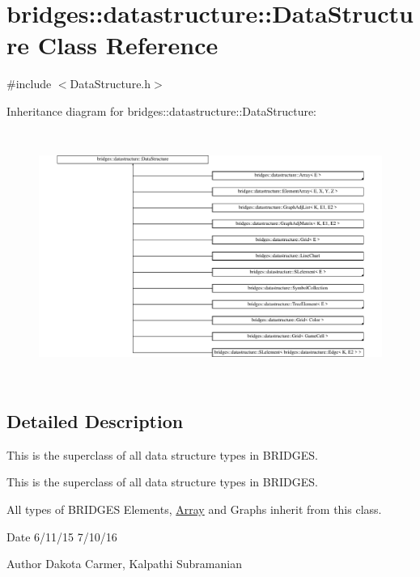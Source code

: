\hypertarget{classbridges_1_1datastructure_1_1_data_structure}{}\section{bridges\+:\+:datastructure\+:\+:Data\+Structure Class Reference}
\label{classbridges_1_1datastructure_1_1_data_structure}


{\ttfamily \#include $<$Data\+Structure.\+h$>$}

Inheritance diagram for bridges\+:\+:datastructure\+:\+:Data\+Structure\+:\begin{figure}[H]
\begin{center}
\leavevmode
\includegraphics[height=8.216704cm]{classbridges_1_1datastructure_1_1_data_structure}
\end{center}
\end{figure}


\subsection{Detailed Description}
This is the superclass of all data structure types in B\+R\+I\+D\+G\+ES. 

This is the superclass of all data structure types in B\+R\+I\+D\+G\+ES.

All types of B\+R\+I\+D\+G\+ES Elements, \mbox{\hyperlink{classbridges_1_1datastructure_1_1_array}{Array}} and Graphs inherit from this class.

\begin{DoxyDate}{Date}
6/11/15 7/10/16 
\end{DoxyDate}
\begin{DoxyAuthor}{Author}
Dakota Carmer, Kalpathi Subramanian 
\end{DoxyAuthor}
